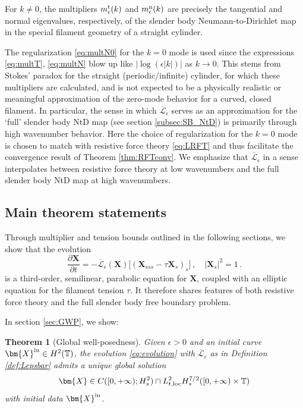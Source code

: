 \documentclass[11pt,reqno]{amsart}
\newcommand{\T}{\mathbb{T}}
\newcommand{\X}{\bm{X}}
\newcommand{\p}{\partial}
\newcommand{\abs}[1]{\left\lvert #1 \right\rvert}
\newcommand{\mc}[1]{\mathcal{#1}}
\numberwithin{equation}{section}
\newtheorem{theorem}{Theorem}[section]
\theoremstyle{definition}
\begin{document}
For $k\neq 0$, the multipliers $m_\epsilon^{\rm t}(k)$ and $m_\epsilon^{\rm n}(k)$ are precisely the tangential and normal eigenvalues, respectively, of the slender body Neumann-to-Dirichlet map in the special filament geometry of a straight cylinder. 

The regularization \eqref{eq:multN0} for the $k=0$ mode is used since the expressions \eqref{eq:multT}, \eqref{eq:multN} blow up like $\abs{\log(\epsilon |k|)}$ as $k\to 0$. This stems from Stokes' paradox for the straight (periodic/infinite) cylinder, for which these multipliers are calculated, and is not expected to be a physically realistic or meaningful approximation of the zero-mode behavior for a curved, closed filament. In particular, the sense in which $\overline{\mc{L}}_\epsilon$ serves as an approximation for the `full' slender body NtD map (see section \ref{subsec:SB_NtD}) is primarily through high wavenumber behavior. 
Here the choice of regularization for the $k=0$ mode is chosen to match with resistive force theory \eqref{eq:LRFT} and thus facilitate the convergence result of Theorem \ref{thm:RFTconv}. We emphasize that $\overline{\mc{L}}_\epsilon$ in a sense interpolates between resistive force theory at low wavenumbers and the full slender body NtD map at high wavenumbers.



\subsection{Main theorem statements}
Through multiplier and tension bounds outlined in the following sections, we show that the evolution 
\begin{equation}\label{eq:evolution}
\frac{\p\X}{\p t} = -\overline{\mc{L}}_\epsilon(\X)\big[(\X_{sss}-\tau\X_s)_s\big] \,, \quad \abs{\X_s}^2=1\,.
\end{equation}
is a third-order, semilinear, parabolic equation for $\X$, coupled with an elliptic equation for the filament tension $\tau$. It therefore shares features of both resistive force theory and the full slender body free boundary problem. 

In section \ref{sec:GWP}, we show:
\begin{theorem}[Global well-posedness]\label{thm:GWP}
  Given $\epsilon>0$ and an initial curve $\X^{\rm in}\in H^2(\T)$, the evolution \eqref{eq:evolution} with $\overline{\mc{L}}_\epsilon$ as in Definition \ref{def:Lepsbar} admits a unique global solution 
\begin{equation}
  \X\in C([0,+\infty);H^2_s)\cap L^2_{t,{\rm loc}}H^{7/2}_s([0,+\infty) \times \T)
\end{equation}
with initial data $\X^{\rm in}$.
\end{theorem} 
\end{document}
